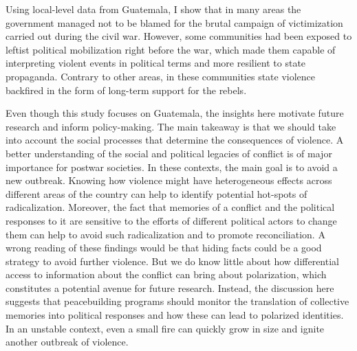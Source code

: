 \documentclass[12pt, notitlepage]{article}
\begin{document}
Using local-level data from Guatemala, I show that in many areas the government managed not to be blamed for the brutal campaign of victimization carried out during the civil war.
However, some communities had been exposed to leftist political mobilization right before the war, which made them capable of interpreting violent events in political terms and more resilient to state propaganda.
Contrary to other areas, in these communities state violence backfired in the form of long-term support for the rebels.

Even though this study focuses on Guatemala, the insights here motivate future research and inform policy-making.
The main takeaway is that we should take into account the social processes that determine the consequences of violence.
A better understanding of the social and political legacies of conflict is of major importance for postwar societies.
In these contexts, the main goal is to avoid a new outbreak.
Knowing how violence might have heterogeneous effects across different areas of the country can help to identify potential hot-spots of radicalization.
Moreover, the fact that memories of a conflict and the political responses to it are sensitive to the efforts of different political actors to change them can help to avoid such radicalization and to promote reconciliation.
A wrong reading of these findings would be that hiding facts could be a good strategy to avoid further violence.
But we do know little about how differential access to information about the conflict can bring about polarization, which constitutes a potential avenue for future research.
Instead, the discussion here suggests that peacebuilding programs should monitor the translation of collective memories into political responses and how these can lead to polarized identities.
In an unstable context, even a small fire can quickly grow in size and ignite another outbreak of violence.




\newpage

\end{document}
